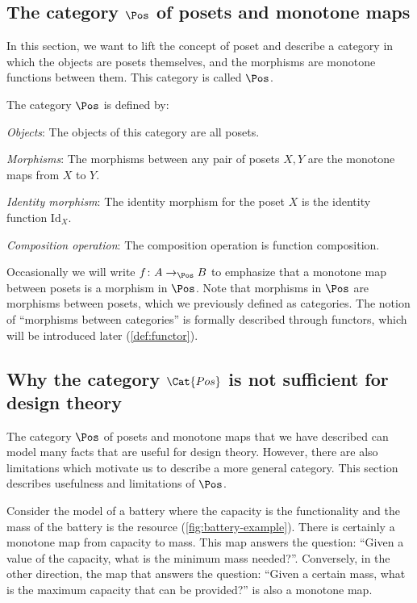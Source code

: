 \subsection{The category $\Pos$ of posets and monotone maps}
In this section, we want to lift the concept of poset and describe a category in which the objects are posets themselves, and the morphisms are monotone functions between them. This category is called $\Pos$.

\begin{definition}
    The category $\Pos$ is defined by:
    \begin{compactenum}
    \item \emph{Objects}: The objects of this category are all posets.
    \item \emph{Morphisms}: The morphisms between any pair of posets $X, Y$
    are the monotone maps from $X$ to $Y$.
    \item \emph{Identity morphism}:  The identity morphism for the poset $X$
    is the identity function $\text{Id}_X$.
    \item \emph{Composition operation}: The composition operation is function
    composition.
    \end{compactenum}
\end{definition}

Occasionally we will write $f \colon A \to_{\Pos} B$ to emphasize that a monotone map between posets is a morphism in $\Pos$. Note that morphisms in $\Pos$ are morphisms between posets, which we previously defined as categories. The notion of ``morphisms between categories'' is formally described through functors, which will be introduced later (\cref{def:functor}).


\subsection{Why the category $\Cat{Pos}$ is not sufficient for design theory}


The category $\Pos$ of posets and monotone maps that we have described can model many facts that are useful for design theory. However, there are also limitations which motivate us to describe a more general category. This section describes usefulness and limitations of $\Pos$.

\begin{example}[Battery]
Consider the model of a battery where the capacity is the functionality and the mass of the battery is the resource (\cref{fig:battery-example}). There is certainly a monotone map from capacity to mass. This map answers the question: ``Given a value of the capacity, what is the minimum mass needed?''. Conversely, in the other direction, the map that answers the question: ``Given a certain mass, what is the maximum capacity that can be provided?'' is also a monotone map.
\end{example}

